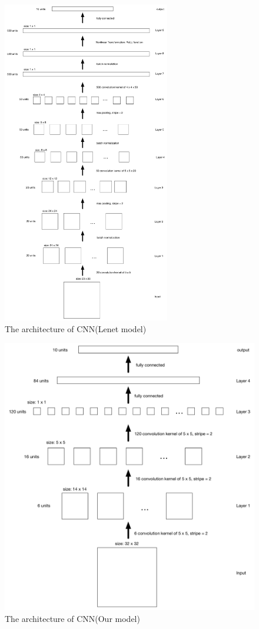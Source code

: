 \documentclass[12pt]{article}
\begin{document}
\begin{figure}[tbp]
	\centering
	\includegraphics[width =0.65\textwidth]{cnn_arch}		
	\caption{The architecture of CNN(Lenet model)}
	\label{fig:arch1}
\end{figure}

\begin{figure}[tbp]
	\centering
	\includegraphics[width = \textwidth]{cnn}		
	\caption{The architecture of CNN(Our model)}
	\label{fig:arch2}
\end{figure}
\end{document}
